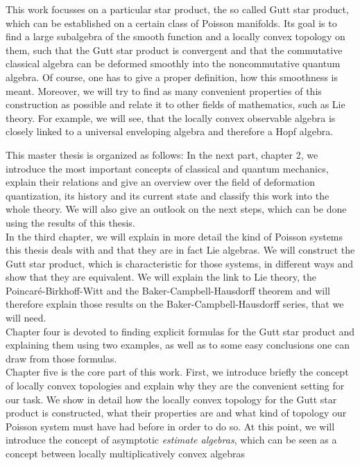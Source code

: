 This work focusses on a particular star product, the so called Gutt star 
product, which can be established on a certain class of Poisson manifolds. Its 
goal is to find a large subalgebra of the smooth function and a locally convex 
topology on them, such that the Gutt star product is convergent and that the 
commutative classical algebra can be deformed smoothly into the noncommutative 
quantum algebra. Of course, one has to give a proper definition, how this
smoothness is meant. Moreover, we will try to find as many convenient 
properties of this construction as possible and relate it to other fields of 
mathematics, such as Lie theory. For example, we will see, that the locally 
convex observable algebra is closely linked to a universal enveloping algebra 
and therefore a Hopf algebra.


This master thesis is organized as follows: In the next part, chapter 2, we 
introduce the most important concepts of classical and quantum mechanics, 
explain their relations and give an overview over the field of deformation 
quantization, its history and its current state and classify this work into the  
whole theory. We will also give an outlook on the next steps, which can be done 
using the results of this thesis.\\
In the third chapter, we will explain in more detail the kind of Poisson 
systems this thesis deals with and that they are in fact Lie algebras. We will 
construct the Gutt star product, which is characteristic for those systems, in 
different ways and show that they are equivalent. We will explain the link 
to Lie theory, the Poincar\'e-Birkhoff-Witt and the Baker-Campbell-Hausdorff 
theorem and will therefore explain those results on the 
Baker-Campbell-Hausdorff series, that we will need.\\
Chapter four is devoted to finding explicit formulas for the Gutt star product 
and explaining them using two examples, as well as to some easy conclusions one 
can draw from those formulas.\\
Chapter five is the core part of this work. First, we introduce briefly the 
concept of locally convex topologies and explain why they are the convenient 
setting for our task. We show in detail how the locally convex topology for the 
Gutt star product is constructed, what their properties are and what kind of 
topology our Poisson system must have had before in order to do so. At this 
point, we will introduce the concept of asymptotic \emph{estimate algebras}, 
which can be seen as a concept between locally multiplicatively convex algebras 
